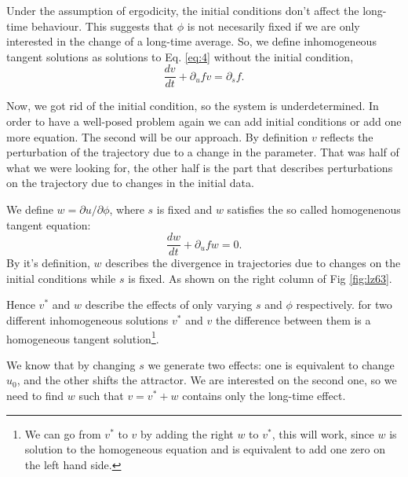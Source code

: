 \documentclass[10pt,twoside,a4paper]{article} %
\begin{document}
Under the assumption of ergodicity, the initial conditions don't affect the long-time behaviour. This suggests that $\phi$ is not necesarily fixed if we are only interested in the change of a long-time average. So, we define inhomogeneous tangent solutions as solutions to Eq. \ref{eq:4} without the initial condition,
\begin{equation}
  \frac{dv}{dt} + \partial_u fv = \partial_s f.
  \label{eq:5}
\end{equation}

Now, we got rid of the initial condition, so the system is underdetermined. In order to have a well-posed problem again we can add initial conditions or add one more equation. The second will be our approach. By definition $v$ reflects the perturbation of the trajectory due to a change in the parameter. That was half of what we were looking for, the other half is the part that describes perturbations on the trajectory due to changes in the initial data.

We define $w = \partial u / \partial \phi$, where $s$ is fixed and $w$ satisfies the so called homogenenous tangent equation:
\begin{equation}
  \frac{dw}{dt} + \partial_u fw = 0.
  \label{eq:6}
\end{equation}
By it's definition, $w$ describes the divergence in trajectories due to changes on the initial conditions while $s$ is fixed. As shown on the right column of Fig \ref{fig:lz63}.

Hence $v^*$ and $w$ describe the effects of only varying $s$ and $\phi$ respectively. for two different inhomogeneous solutions $v^*$ and $v$ the difference between them is a homogeneous tangent solution\footnote{We can go from $v^*$ to $v$ by adding the right $w$ to $v^*$, this will work, since $w$ is solution to the homogeneous equation and is equivalent to add one zero on the left hand side.}.

We know that by changing $s$ we generate two effects: one is equivalent to change $u_0$, and the other shifts the attractor. We are interested on the second one, so we need to find $w$ such that $v = v^* + w$ contains only the long-time effect.
\end{document}

